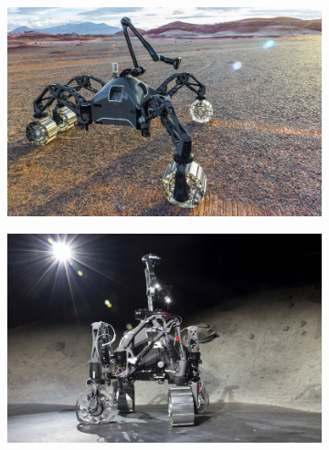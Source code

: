\begin{figure}%
\vspace{-2ex}
	\centering
    \setlength{\subfigureWidth}{0.32\textwidth}
    \setlength{\graphicsHeight}{33mm}
    \hypersetup{hidelinks=true}%
	\begin{subfigure}[t]{\subfigureWidth}
        \centering
		\includegraphics[height=\graphicsHeight]{pictures/SherpaTT_QuasiTripod}
		\label{fig:SherpaTT_QuasiTripod}
	\end{subfigure}\hfill
	\begin{subfigure}[t]{\subfigureWidth}
        \centering
		\includegraphics[height=\graphicsHeight]{pictures/SherpaTT_Stow}
		\label{fig:SherpaTT_Stow}
	\end{subfigure}\hfill
    \begin{subfigure}[t]{\subfigureWidth}

\end{subfigure}
\end{figure}
